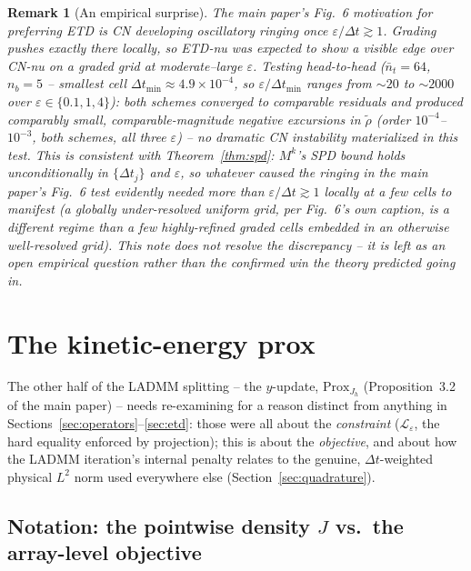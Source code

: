 \documentclass[11pt]{article}
\newtheorem{remark}{Remark}
\newcommand{\eps}{\varepsilon}
\newcommand{\dt}{\Delta t}
\begin{document}
\begin{remark}[An empirical surprise]
The main paper's Fig.~6 motivation for preferring ETD is CN developing oscillatory ringing once
$\eps/\dt\gtrsim1$. Grading pushes exactly there locally, so ETD-nu was expected to show a
visible edge over CN-nu on a graded grid at moderate--large $\eps$. Testing head-to-head
($\bar n_t=64$, $n_b=5$ -- smallest cell $\dt_{\min}\approx 4.9\times10^{-4}$, so
$\eps/\dt_{\min}$ ranges from $\sim\!20$ to $\sim\!2000$ over $\eps\in\{0.1,1,4\}$): both schemes
converged to comparable residuals and produced comparably small, comparable-magnitude negative
excursions in $\tilde\rho$ (order $10^{-4}$--$10^{-3}$, both schemes, all three $\eps$) -- no
dramatic CN instability materialized in this test. This is consistent with
Theorem~\ref{thm:spd}: $M^k$'s SPD bound holds \emph{unconditionally} in $\{\dt_j\}$ and $\eps$,
so whatever caused the ringing in the main paper's Fig.~6 test evidently needed more than
$\eps/\dt\gtrsim1$ locally at a few cells to manifest (a globally under-resolved uniform grid,
per Fig.~6's own caption, is a different regime than a few highly-refined graded cells embedded
in an otherwise well-resolved grid). This note does not resolve the discrepancy -- it is left as
an open empirical question rather than the confirmed win the theory predicted going in.
\end{remark}

\section{The kinetic-energy prox}
\label{sec:ke-prox}

The other half of the LADMM splitting -- the $y$-update, $\mathrm{Prox}_{J_h}$ (Proposition~3.2
of the main paper) -- needs re-examining for a reason distinct from anything in
Sections~\ref{sec:operators}--\ref{sec:etd}: those were all about the \emph{constraint}
($\mathcal{L}_\eps$, the hard equality enforced by projection); this is about the
\emph{objective}, and about how the LADMM iteration's internal penalty relates to the genuine,
$\dt$-weighted physical $L^2$ norm used everywhere else (Section~\ref{sec:quadrature}).

\subsection*{Notation: the pointwise density $J$ vs.\ the array-level objective}
\end{document}
